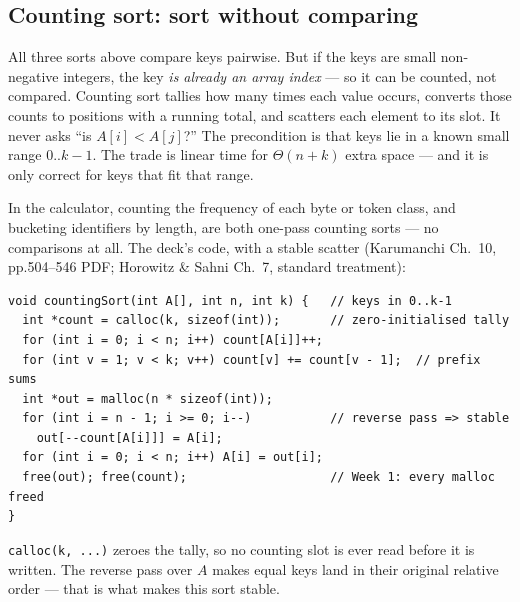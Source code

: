 \documentclass[11pt]{article}
\begin{document}

\subsection{Counting sort: sort without comparing}

All three sorts above compare keys pairwise. But if the keys are small non-negative integers, the key \emph{is already an array index} --- so it can be counted, not compared. Counting sort tallies how many times each value occurs, converts those counts to positions with a running total, and scatters each element to its slot. It never asks ``is $A[i] < A[j]$?'' The precondition is that keys lie in a known small range $0..k-1$. The trade is linear time for $\Theta(n + k)$ extra space --- and it is only correct for keys that fit that range.

In the calculator, counting the frequency of each byte or token class, and bucketing identifiers by length, are both one-pass counting sorts --- no comparisons at all. The deck's code, with a stable scatter (Karumanchi Ch.~10, pp.504--546 PDF; Horowitz \& Sahni Ch.~7, standard treatment):

{\footnotesize
\begin{verbatim}
void countingSort(int A[], int n, int k) {   // keys in 0..k-1
  int *count = calloc(k, sizeof(int));       // zero-initialised tally
  for (int i = 0; i < n; i++) count[A[i]]++;
  for (int v = 1; v < k; v++) count[v] += count[v - 1];  // prefix sums
  int *out = malloc(n * sizeof(int));
  for (int i = n - 1; i >= 0; i--)           // reverse pass => stable
    out[--count[A[i]]] = A[i];
  for (int i = 0; i < n; i++) A[i] = out[i];
  free(out); free(count);                    // Week 1: every malloc freed
}
\end{verbatim}
}
\cite{Karumanchi2017_data_structures_algorithms_made_easy,HorowitzSahni2008_fundamentals_data_structures}

\texttt{calloc(k, ...)} zeroes the tally, so no counting slot is ever read before it is written. The reverse pass over $A$ makes equal keys land in their original relative order --- that is what makes this sort stable.
\end{document}
